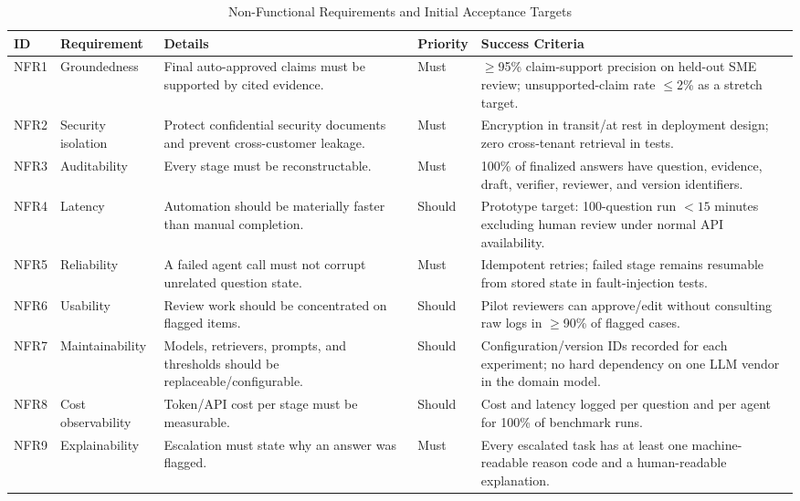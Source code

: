 \documentclass[11pt,journal,onecolumn]{IEEEtran}
\begin{document}
\begin{table}[H]
\centering
\caption{Non-Functional Requirements and Initial Acceptance Targets}
\small
\begin{tabularx}{\textwidth}{L{0.08\textwidth}L{0.20\textwidth}Y L{0.09\textwidth}Y}
\toprule
\textbf{ID} & \textbf{Requirement} & \textbf{Details} & \textbf{Priority} & \textbf{Success Criteria} \\
\midrule
NFR1 & Groundedness & Final auto-approved claims must be supported by cited evidence. & Must & $\geq$95\% claim-support precision on held-out SME review; unsupported-claim rate $\leq$2\% as a stretch target. \\
NFR2 & Security isolation & Protect confidential security documents and prevent cross-customer leakage. & Must & Encryption in transit/at rest in deployment design; zero cross-tenant retrieval in tests. \\
NFR3 & Auditability & Every stage must be reconstructable. & Must & 100\% of finalized answers have question, evidence, draft, verifier, reviewer, and version identifiers. \\
NFR4 & Latency & Automation should be materially faster than manual completion. & Should & Prototype target: 100-question run $<15$ minutes excluding human review under normal API availability. \\
NFR5 & Reliability & A failed agent call must not corrupt unrelated question state. & Must & Idempotent retries; failed stage remains resumable from stored state in fault-injection tests. \\
NFR6 & Usability & Review work should be concentrated on flagged items. & Should & Pilot reviewers can approve/edit without consulting raw logs in $\geq$90\% of flagged cases. \\
NFR7 & Maintainability & Models, retrievers, prompts, and thresholds should be replaceable/configurable. & Should & Configuration/version IDs recorded for each experiment; no hard dependency on one LLM vendor in the domain model. \\
NFR8 & Cost observability & Token/API cost per stage must be measurable. & Should & Cost and latency logged per question and per agent for 100\% of benchmark runs. \\
NFR9 & Explainability & Escalation must state why an answer was flagged. & Must & Every escalated task has at least one machine-readable reason code and a human-readable explanation. \\
\bottomrule
\end{tabularx}
\end{table}
\end{document}
